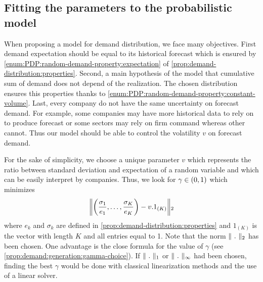 \subsection{Fitting the parameters to the probabilistic model}
\label{sec:PDP:numerical-experiments:instances:fitting-parameters}


When proposing a model for demand distribution, we face many objectives.
First demand expectation should be equal to its historical forecast which is ensured by \cref{enum:PDP:random-demand-property:expectation} of \cref{prop:demand-distribution:properties}.
Second, a main hypothesis of the model that cumulative sum of demand does not depend of the realization.
The chosen distribution ensures this properties thanks to \cref{enum:PDP:random-demand-property:constant-volume}.
Last, every company do not have the same uncertainty on forecast demand.
For example, some companies may have more historical data to rely on to produce forecast or some sectors may rely on firm command whereas other cannot.
Thus our model should be able to control the volatility $v$ on forecast demand.


For the sake of simplicity, we choose a unique parameter $v$ which represents the ratio between standard deviation and expectation of a random variable and which can be easily interpret by companies.
Thus, we look for $\gamma\in\bracket{0,1}$ which minimizes
\begin{equation}
  \norm{\bracket{\frac{\sigma_1}{e_1},\ldots,\frac{\sigma_K}{e_K}}-v.1_{(K)}}_2
\end{equation}
where $e_k$ and $\sigma_k$ are defined in \cref{prop:demand-distribution:properties} and $1_{(K)}$ is the vector with length $K$ and all entries equal to 1.
Note that the norm $\norm{\ .\ }_2$ has been chosen.
One advantage is the close formula for the value of $\gamma$ (see \cref{prop:demand:generation:gamma-choice}).
If $\norm{\ .\ }_1$ or $\norm{\ .\ }_{\infty}$ had been chosen, finding the best $\gamma$ would be done with classical linearization methods and the use of a linear solver.






